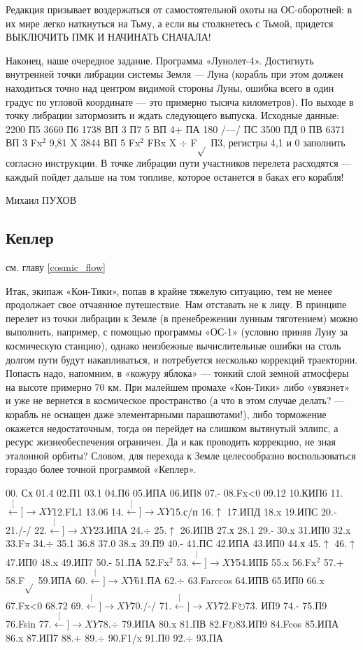 \documentclass[11pt,a4paper,oneside]{article}
\def\XY{$\stackrel[\leftarrow]{\rightarrow}{XY}$}
\def\FO{F$\circlearrowright$}
\begin{document}
Редакция призывает воздержаться от самостоятельной охоты на ОС-оборотней: в их мире легко наткнуться на Тьму, а если вы столкнетесь с Тьмой, придется ВЫКЛЮЧИТЬ ПМК И НАЧИНАТЬ СНАЧАЛА!

Наконец, наше очередное задание. Программа «Лунолет-4». Достигнуть внутренней точки либрации системы Земля — Луна (корабль при этом должен находиться точно над центром видимой стороны Луны, ошибка всего в один градус по угловой координате — это примерно тысяча километров). По выходе в точку либрации затормозить и ждать следующего выпуска. Исходные данные: 2200 П5 3660 П6 1738 ВП 3 П7 5 ВП 4+ ПА 180 /—/ ПС 3500 ПД 0 ПВ 6371 ВП 3 Fx$^{2}$ 9,81 X 3844 ВП 5 Fx$^{2}$ FBx X $\div$ F$\sqrt{}$ П3, регистры 4,1 и 0 заполнить согласно инструкции. В точке либрации пути участников перелета расходятся — каждый пойдет дальше на том топливе, которое останется в баках его корабля!

Михаил ПУХОВ

\subsection{Кеплер}
см. главу \ref{cosmic_flow}

Итак, экипаж «Кон-Тики», попав в крайне тяжелую ситуацию, тем не менее продолжает свое отчаянное путешествие. Нам отставать не к лицу. В принципе перелет из точки либрации к Земле (в пренебрежении лунным тяготением) можно выполнить, например, с помощью программы «ОС-1» (условно приняв Луну за космическую станцию), однако неизбежные вычислительные ошибки на столь долгом пути будут накапливаться, и потребуется несколько коррекций траектории. Попасть надо, напомним, в «кожуру яблока» — тонкий слой земной атмосферы на высоте примерно 70 км. При малейшем промахе «Кон-Тики» либо «увязнет» и уже не вернется в космическое пространство (а что в этом случае делать? — корабль не оснащен даже элементарными парашютами!), либо торможение окажется недостаточным, тогда он перейдет на слишком вытянутый эллипс, а ресурс жизнеобеспечения ограничен. Да и как проводить коррекцию, не зная эталонной орбиты? Словом, для перехода к Земле целесообразно воспользоваться гораздо более точной программой «Кеплер».

00. Сх 01.4 02.П1 03.1 04.П6 05.ИПА 06.ИП8 07.- 08.Fx<0 09.12 10.КИП6 11.\XY 12.FL1 13.06 14.\XY 15.с/п
16.$\uparrow$ 17.ИПД 18.x 19.ИПС 20.- 21./-/ 22.\XY 23.ИПА 24.$\div$ 25.$\uparrow$ 26.ИПВ
27.х 28.1 29.- 30.x 31.ИП0 32.x 33.F$\pi$ 34.$\div$ 35.1 36.8 37.0 38.x 39.П9 40.- 41.ПС 42.ИПА 43.ИП0 44.х 45.$\uparrow$ 46.$\uparrow$ 47.ИП0 48.x 49.ИП7 50.- 51.ПА 52.Fx$^{2}$ 53.\XY 54.ИПБ 55.x 56.Fx$^{2}$ 57.+ 58.F$\sqrt{}$ 59.ИПА 60.\XY 61.ПА 62.$\div$ 63.Farccos 64.ИПВ 65.ИП0 66.x 67.Fx<0 68.72 69.\XY 70./-/ 71.\XY 72.\FO 73. ИП9 74.- 75.П9 76.Fsin 77.\XY 78.$\div$ 79.ИПА 80.x 81.ПВ 82.\FO 83.ИП9 84.Fcos 85.ИПА 86.x 87.ИП7 88.+ 89.$\div$ 90.F1/x 91.П0 92.$\div$ 93.ПА
\end{document}
